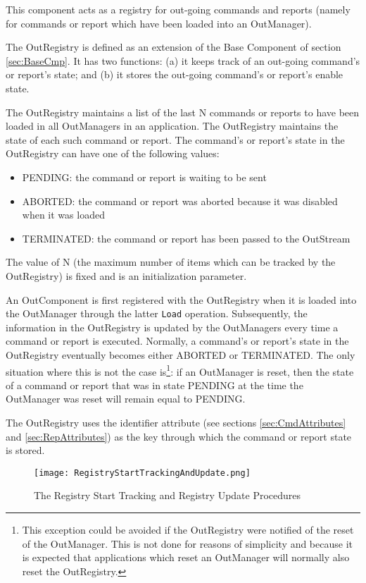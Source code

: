 This component acts as a registry for out-going commands and reports (namely for commands or report which have been loaded into an OutManager).

The OutRegistry is defined as an extension of the Base Component of section \ref{sec:BaseCmp}. It has two functions: (a) it keeps track of an out-going command's or report's state; and (b) it stores the out-going command's or report's enable state.

The OutRegistry maintains a list of the last N commands or reports to have been loaded in all OutManagers in an application. The OutRegistry maintains the state of each such command or report. The command's or report's state in the OutRegistry can have one of the following values:
\begin{itemize}
\item PENDING: the command or report is waiting to be sent
\item ABORTED: the command or report was aborted because it was disabled when it was loaded
\item TERMINATED: the command or report has been passed to the OutStream
\end{itemize}
The value of N (the maximum number of items which can be tracked by the OutRegistry) is fixed and is an initialization parameter.

An OutComponent is first registered with the OutRegistry when it is loaded into the OutManager through the latter \texttt{Load} operation. Subsequently, the information in the OutRegistry is updated by the OutManagers every time a command or report is executed. Normally, a command's or report's state in the OutRegistry eventually becomes either ABORTED or TERMINATED. The only situation where this is not the case is\footnote{This exception could be avoided if the OutRegistry were notified of the reset of the OutManager. This is not done for reasons of simplicity and because it is expected that applications which reset an OutManager will normally also reset the OutRegistry.}: if an OutManager is reset, then the state of a command or report that was in state PENDING at the time the OutManager was reset will remain equal to PENDING.

The OutRegistry uses the identifier attribute (see sections \ref{sec:CmdAttributes} and \ref{sec:RepAttributes}) as the key through which the command or report state is stored.

\begin{figure}[h]
 \centering
 \texttt{[image: RegistryStartTrackingAndUpdate.png]}
 \caption{The Registry Start Tracking and Registry Update Procedures}
 \label{fig:RegistryStartTrackingAndUpdate}
\end{figure}

